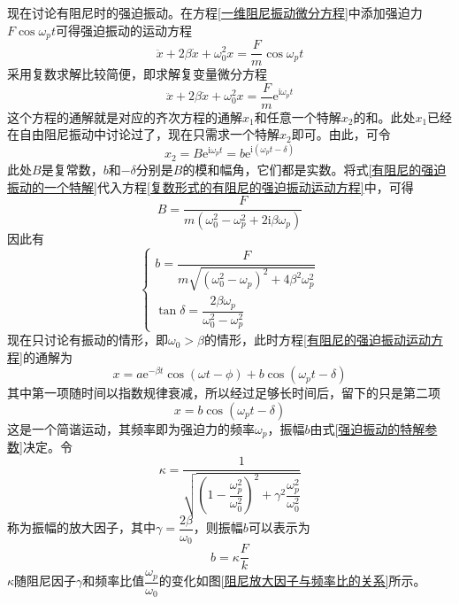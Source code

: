 现在讨论有阻尼时的强迫振动。在方程\eqref{一维阻尼振动微分方程}中添加强迫力$F\cos \omega_p t$可得强迫振动的运动方程
\begin{equation}
	\ddot{x} + 2\beta \dot{x} + \omega_0^2 x = \frac{F}{m} \cos \omega_p t
	\label{有阻尼的强迫振动运动方程}
\end{equation}
采用复数求解比较简便，即求解复变量微分方程
\begin{equation}
	\ddot{x} + 2\beta \dot{x} + \omega_0^2 x = \frac{F}{m} \mathrm{e}^{\mathrm{i} \omega_p t}
	\label{复数形式的有阻尼的强迫振动运动方程}
\end{equation}
这个方程的通解就是对应的齐次方程的通解$x_1$和任意一个特解$x_2$的和。此处$x_1$已经在自由阻尼振动中讨论过了，现在只需求一个特解$x_2$即可。由此，可令
\begin{equation}
	x_2 = B\mathrm{e}^{\mathrm{i}\omega_p t} = b\mathrm{e}^{\mathrm{i}(\omega_p t - \delta)}
	\label{有阻尼的强迫振动的一个特解}
\end{equation}
此处$B$是复常数，$b$和$-\delta$分别是$B$的模和幅角，它们都是实数。将式\eqref{有阻尼的强迫振动的一个特解}代入方程\eqref{复数形式的有阻尼的强迫振动运动方程}中，可得
\begin{equation*}
	B = \frac{F}{m(\omega_0^2-\omega_p^2 +2\mathrm{i}\beta \omega_p)}
\end{equation*}
因此有
\begin{equation}
\begin{cases}
	b = \dfrac{F}{m\sqrt{(\omega_0^2-\omega_p)^2+4\beta^2 \omega_p^2}} \\[1.5ex]
	\tan \delta = \dfrac{2\beta \omega_p}{\omega_0^2 - \omega_p^2}
\end{cases}
\label{强迫振动的特解参数}
\end{equation}
现在只讨论有振动的情形，即$\omega_0>\beta$的情形，此时方程\eqref{有阻尼的强迫振动运动方程}的通解为
\begin{equation}
	x = a\mathrm{e}^{-\beta t} \cos (\omega t-\phi) + b\cos(\omega_p t - \delta)
\end{equation}
其中第一项随时间以指数规律衰减，所以经过足够长时间后，留下的只是第二项
\begin{equation*}
	x = b\cos (\omega_p t-\delta)
\end{equation*}
这是一个简谐运动，其频率即为强迫力的频率$\omega_p$，振幅$b$由式\eqref{强迫振动的特解参数}决定。令
\begin{equation}
	\kappa = \frac{1}{\sqrt{\left(1-\dfrac{\omega_p^2}{\omega_0^2}\right)^2+\gamma^2 \dfrac{\omega_p^2}{\omega_0^2}}}
	\label{强迫振动的振幅放大因子}
\end{equation}
称为{\heiti 振幅的放大因子}，其中$\gamma=\dfrac{2\beta}{\omega_0}$，则振幅$b$可以表示为
\begin{equation*}
	b = \kappa\frac{F}{k}
\end{equation*}
$\kappa$随阻尼因子$\gamma$和频率比值$\dfrac{\omega_p}{\omega_0}$的变化如图\ref{阻尼放大因子与频率比的关系}所示。

